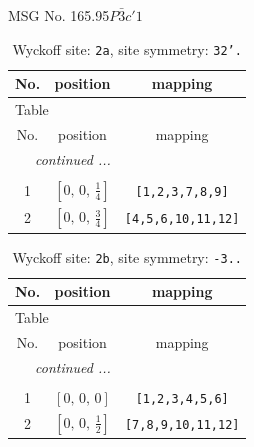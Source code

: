 \documentclass[fleqn,8pt]{jsarticle}
\begin{document}
\setcounter{MaxMatrixCols}{32}

\renewcommand{\tablename}{Table~}
\renewcommand{\figurename}{Figure~}
\begin{center}
\LARGE
MSG No. 165.95\quad$P\bar{3}c'1$
\end{center}
\renewcommand{\arraystretch}{1.2}
\begin{longtable}{ccc}
\caption{Wyckoff site: {\tt 2a}, site symmetry: {\tt 32'.}}
 \\
 \hline \hline
No. & position & mapping \\ \hline \endfirsthead

\multicolumn{2}{l}{\tablename\ \thetable{}} \\
 \hline \hline
No. & position & mapping \\ \hline \endhead

 \hline \hline
\multicolumn{2}{r}{\footnotesize\it continued ...} \\ \endfoot

 \hline \hline
\multicolumn{2}{r}{} \\ \endlastfoot

1 & $\left[ 0,\, 0,\, \frac{1}{4} \right]$ & {\tt [1,2,3,7,8,9]} \\ \hline
2 & $\left[ 0,\, 0,\, \frac{3}{4} \right]$ & {\tt [4,5,6,10,11,12]} \\
\end{longtable}
\renewcommand{\arraystretch}{1.2}
\begin{longtable}{ccc}
\caption{Wyckoff site: {\tt 2b}, site symmetry: {\tt -3..}}
 \\
 \hline \hline
No. & position & mapping \\ \hline \endfirsthead

\multicolumn{2}{l}{\tablename\ \thetable{}} \\
 \hline \hline
No. & position & mapping \\ \hline \endhead

 \hline \hline
\multicolumn{2}{r}{\footnotesize\it continued ...} \\ \endfoot

 \hline \hline
\multicolumn{2}{r}{} \\ \endlastfoot

1 & $\left[ 0,\, 0,\, 0 \right]$ & {\tt [1,2,3,4,5,6]} \\ \hline
2 & $\left[ 0,\, 0,\, \frac{1}{2} \right]$ & {\tt [7,8,9,10,11,12]} \\
\end{longtable}
\end{document}
